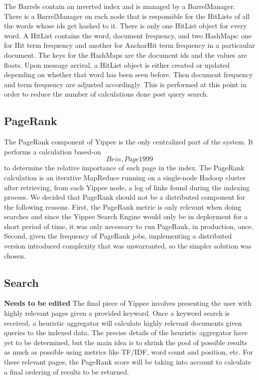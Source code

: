 \documentclass[11pt, letterpaper, oneside, twocolumn]{article}
\begin{document}
The Barrels contain an inverted index and is managed by a BarrelManager. There is a BarrelManager on each node that is responsible for the HitLists of all the words whose ids get hashed to it. There is only one HitList object for every word. A HitList contains the word, document frequency, and two HashMaps: one for Hit term frequency and another for AnchorHit term frequency in a particaular document. The keys for the HashMaps are the document ids and the values are floats. Upon message arrival, a HitList object is either created or updated depending on whether that word has been seen before. Then document frequency and term frequency are adjusted accordingly. This is performed at this point in order to reduce the number of calculations done post query search.  


\subsection{PageRank}

The PageRank component of Yippee is the only centralized part of the system.
It performs a calculation based-on \[Brin, Page 1999\]\cite{pagerank} to determine the relative importance of each page in the index.
The PageRank calculation is an iterative MapReduce running on a single-node Hadoop cluster after retrieving, from each Yippee node, a log of links found during the indexing process.
We decided that PageRank should not be a distributed component for the following reasons. 
First, the PageRank metric is only relevant when doing searches and since the Yippee Search Engine would only be in deployment for a short period of time, it was only necessary to run PageRank, in production, once.
Second, given the frequency of PageRank jobs, implementing a distributed version introduced complexity that was unwarranted, so the simpler solution was chosen.


\subsection{Search}
\textbf{Needs to be edited}
The final piece of Yippee involves presenting the user with highly relevant pages given a provided keyword.
Once a keyword search is received, a heuristic aggregator will calculate highly relevant documents given queries to the indexed data.
The precise details of the heuristic aggregator have yet to be determined, but the main idea is to shrink the pool of possible results as much as possible using metrics like TF/IDF, word count and position, etc.
For these relevant pages, the PageRank score will be taking into account to calculate a final ordering of results to be returned.
\end{document}
